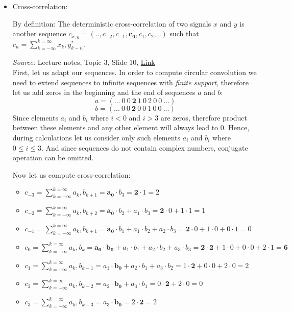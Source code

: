 \documentclass{article}
\begin{document}
\begin{itemize}
    \item Cross-correlation: 
    
    By definition: The deterministic cross-correlation of two signals $x$ and $y$ is another sequence $c_{x,y}=(..,c_{-2},c_{-1},\pmb{c_0},c_1,c_2,..)$ such that $c_n=\sum^{k=\infty}_{k=-\infty}x_k,y^*_{k-n}$.
    
    \emph{Source:} Lecture notes, Topic 3, Slide 10, \href{https://moodle.innopolis.university/pluginfile.php/142933/mod_resource/content/1/DSPt3spr22.pdf}{Link}\\
    
    First, let us adapt our sequences. In order to compute circular convolution we need to extend sequences to infinite sequences with \emph{finite support}, therefore let us add zeros in the beginning and the end of sequences $a$ and $b$:
    $$a=(...\ 0\ 0\ \pmb{2}\ 1\ 0\ 2\ 0\ 0\ ...)$$$$b=(...\ 0\ 0\ \pmb{2}\ 0\ 0\ 1\ 0\ 0\ ...)$$
    \newpage
    Since elements $a_i$ and $b_i$ where $i<0$ and $i>3$ are zeros, therefore product between these elements and any other element will always lead to 0. Hence, during calculations let us consider only such elements $a_i$ and $b_i$ where $0\leq i\leq3$. And since sequences do not contain complex numbers, conjugate operation can be omitted.
    
    Now let us compute cross-correlation:
    \begin{itemize}
        \item $c_{-3}=\sum^{k=\infty}_{k=-\infty}a_k,b_{k+1}=
        \pmb{a_0}\cdot{b_3}=
        \pmb{2}\cdot1=
        2$
        \item $c_{-2}=\sum^{k=\infty}_{k=-\infty}a_k,b_{k+2}=
        \pmb{a_0}\cdot{b_2}+a_1\cdot b_3=
        \pmb{2}\cdot0+1\cdot1=
        1$
        \item $c_{-1}=\sum^{k=\infty}_{k=-\infty}a_k,b_{k+1}=
        \pmb{a_0}\cdot{b_1}+a_1\cdot b_2+a_2\cdot b_3=
        \pmb{2}\cdot0+1\cdot0+0\cdot1=
        0$
        \item $c_0=\sum^{k=\infty}_{k=-\infty}a_k,b_{k}=
        \pmb{a_0}\cdot\pmb{b_0}+a_1\cdot b_1+a_2\cdot b_2 + a_3\cdot b_3=
        \pmb{2}\cdot\pmb{2}+1\cdot0+0\cdot0+2\cdot1=
        \pmb{6}$
        \item $c_1=\sum^{k=\infty}_{k=-\infty}a_k,b_{k-1}=
        a_1\cdot \pmb{b_0}+a_2\cdot b_1 + a_3\cdot b_2=
        1\cdot\pmb{2}+0\cdot0+2\cdot0=
        2$
        \item $c_2=\sum^{k=\infty}_{k=-\infty}a_k,b_{k-2}=
        a_2\cdot \pmb{b_0} + a_3\cdot b_1=
        0\cdot\pmb{2}+2\cdot0=
        0$
        \item $c_3=\sum^{k=\infty}_{k=-\infty}a_k,b_{k-3}=
        a_3\cdot \pmb{b_0}=
        2\cdot\pmb{2}=
        2$
    \end{itemize}
    

\end{itemize}
\end{document}
